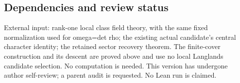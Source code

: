 \hypertarget{odd_scalar-dependencies-and-review-status}{%
\subsection{Dependencies and review
status}\label{odd_scalar-dependencies-and-review-status}}

External input: rank-one local class field theory, with the same fixed
normalization used for omega=det rho; the existing actual candidate's
central character identity; the retained sector recovery theorem. The
finite-cover construction and its descent are proved above and use no
local Langlands candidate selection. No computation is needed. This
version has undergone author self-review; a parent audit is requested.
No Lean run is claimed.
